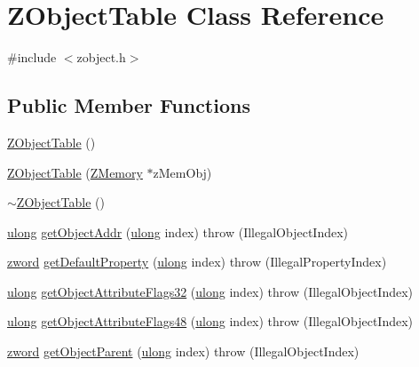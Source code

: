 \hypertarget{class_z_object_table}{\section{Z\-Object\-Table Class Reference}
\label{class_z_object_table}
}


{\ttfamily \#include $<$zobject.\-h$>$}

\subsection*{Public Member Functions}
\begin{DoxyCompactItemize}
\item 
\hyperlink{class_z_object_table_ad36c6a652bffa45d8c5217eb2fbe1e84}{Z\-Object\-Table} ()
\item 
\hyperlink{class_z_object_table_a7de1cb9995571422e98bf68bb8b37f65}{Z\-Object\-Table} (\hyperlink{class_z_memory}{Z\-Memory} $\ast$z\-Mem\-Obj)
\item 
\hyperlink{class_z_object_table_aec7ef9a6dfa851223fd546dd3b083c43}{$\sim$\-Z\-Object\-Table} ()
\item 
\hyperlink{zglobal_8h_a718b4eb2652c286f4d42dc18a8e71a1a}{ulong} \hyperlink{class_z_object_table_a0891575083b39a4d776b145ab21c4d7d}{get\-Object\-Addr} (\hyperlink{zglobal_8h_a718b4eb2652c286f4d42dc18a8e71a1a}{ulong} index)  throw (\-Illegal\-Object\-Index)
\item 
\hyperlink{zglobal_8h_a6507dc55d18847442d5fb20b6c73fe73}{zword} \hyperlink{class_z_object_table_aa9f8ea6a93111ecf70b7591cba14b03e}{get\-Default\-Property} (\hyperlink{zglobal_8h_a718b4eb2652c286f4d42dc18a8e71a1a}{ulong} index)  throw (\-Illegal\-Property\-Index)
\item 
\hyperlink{zglobal_8h_a718b4eb2652c286f4d42dc18a8e71a1a}{ulong} \hyperlink{class_z_object_table_abce2d0d913ce0111458c7087471c3510}{get\-Object\-Attribute\-Flags32} (\hyperlink{zglobal_8h_a718b4eb2652c286f4d42dc18a8e71a1a}{ulong} index)  throw (\-Illegal\-Object\-Index)
\item 
\hyperlink{zglobal_8h_a718b4eb2652c286f4d42dc18a8e71a1a}{ulong} \hyperlink{class_z_object_table_af0cbd1dc351eae1f789c3354eade9cb0}{get\-Object\-Attribute\-Flags48} (\hyperlink{zglobal_8h_a718b4eb2652c286f4d42dc18a8e71a1a}{ulong} index)  throw (\-Illegal\-Object\-Index)
\item 
\hyperlink{zglobal_8h_a6507dc55d18847442d5fb20b6c73fe73}{zword} \hyperlink{class_z_object_table_aabcd247354045552f410a6ba69501f6f}{get\-Object\-Parent} (\hyperlink{zglobal_8h_a718b4eb2652c286f4d42dc18a8e71a1a}{ulong} index)  throw (\-Illegal\-Object\-Index)

\end{DoxyCompactItemize}
